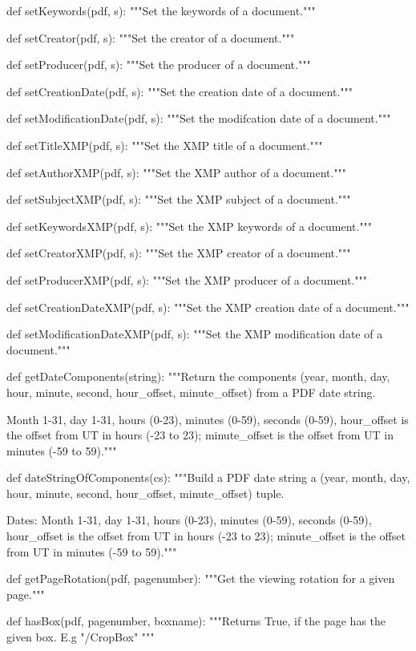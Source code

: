 def setKeywords(pdf, s):
    """Set the keywords of a document."""

def setCreator(pdf, s):
    """Set the creator of a document."""

def setProducer(pdf, s):
    """Set the producer of a document."""

def setCreationDate(pdf, s):
    """Set the creation date of a document."""

def setModificationDate(pdf, s):
    """Set the modifcation date of a document."""

def setTitleXMP(pdf, s):
    """Set the XMP title of a document."""

def setAuthorXMP(pdf, s):
    """Set the XMP author of a document."""

def setSubjectXMP(pdf, s):
    """Set the XMP subject of a document."""

def setKeywordsXMP(pdf, s):
    """Set the XMP keywords of a document."""

def setCreatorXMP(pdf, s):
    """Set the XMP creator of a document."""

def setProducerXMP(pdf, s):
    """Set the XMP producer of a document."""

def setCreationDateXMP(pdf, s):
    """Set the XMP creation date of a document."""

def setModificationDateXMP(pdf, s):
    """Set the XMP modification date of a document."""

def getDateComponents(string):
    """Return the components (year, month, day, hour, minute, second,
    hour_offset, minute_offset) from a PDF date string.

    Month 1-31, day 1-31, hours (0-23), minutes (0-59), seconds
    (0-59), hour_offset is the offset from UT in hours (-23 to 23);
    minute_offset is the offset from UT in minutes (-59 to 59)."""

def dateStringOfComponents(cs):
    """Build a PDF date string a (year, month, day, hour, minute, second,
    hour_offset, minute_offset) tuple.
    
    Dates: Month 1-31, day 1-31, hours (0-23), minutes (0-59), seconds
    (0-59), hour_offset is the offset from UT in hours (-23 to 23);
    minute_offset is the offset from UT in minutes (-59 to 59)."""

def getPageRotation(pdf, pagenumber):
    """Get the viewing rotation for a given page."""

def hasBox(pdf, pagenumber, boxname):
    """Returns True, if the page has the given box. E.g "/CropBox" """

